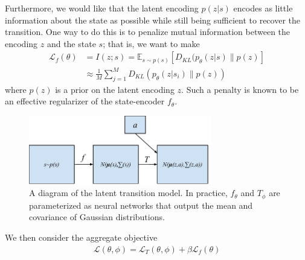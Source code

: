 \documentclass[letterpaper, 10 pt, conference]{ieeeconf}  %
\begin{document}
Furthermore, we would like that the latent encoding $p(z|s)$ encodes as little information about the state as possible while still being sufficient to recover the transition. One way to do this is to penalize mutual information between the encoding $z$ and the state $s$; that is, we want to make
\begin{align*}
	\mathcal{L}_f(\theta) &= I(z;s) = \mathbb{E}_{s\sim p(s)}[D_{KL}(p_\theta(z|s)\| p(z)]\\
	&\approx \frac{1}{M}\sum_{j=1}^M D_{KL}(p_\theta(z|s_i)\| p(z))
\end{align*} 
where $p(z)$ is a prior on the latent encoding $z$. Such a penalty is known to be an effective regularizer of the state-encoder $f_\theta$.
\begin{figure}[t]
\includegraphics[width=8cm]{latentTransitionModelSimple.pdf}
\caption{A diagram of the latent transition model. In practice, $f_\theta$ and $T_\phi$ are parameterized as neural networks that output the mean and covariance of Gaussian distributions.}
\centering
\end{figure}

We then consider the aggregate objective
\begin{align*}
	\mathcal{L}(\theta,\phi) = \mathcal{L}_T(\theta,\phi) + \beta\mathcal{L}_f(\theta)
\end{align*}

\end{document}
